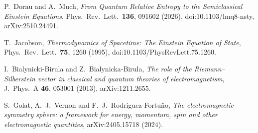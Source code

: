 P.~Dorau and A.~Much, \emph{From Quantum Relative Entropy to the Semiclassical Einstein Equations},
Phys.\ Rev.\ Lett.\ \textbf{136}, 091602 (2026), doi:10.1103/lmq8-nsty, arXiv:2510.24491.

T.~Jacobson, \emph{Thermodynamics of Spacetime: The Einstein Equation of State},
Phys.\ Rev.\ Lett.\ \textbf{75}, 1260 (1995), doi:10.1103/PhysRevLett.75.1260.

I.~Bialynicki-Birula and Z.~Bialynicka-Birula, \emph{The role of the Riemann--Silberstein vector in
classical and quantum theories of electromagnetism}, J.\ Phys.\ A \textbf{46}, 053001 (2013), arXiv:1211.2655.

S.~Golat, A.~J.~Vernon and F.~J.~Rodr\'iguez-Fortu\~no, \emph{The electromagnetic symmetry sphere: a framework for
energy, momentum, spin and other electromagnetic quantities}, arXiv:2405.15718 (2024).

